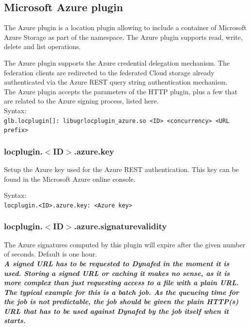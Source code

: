 \documentclass[12pt]{article} %
\begin{document}
\subsection{Microsoft Azure plugin}
The Azure plugin is a location plugin allowing to include a container of Microsoft Azure Storage as part of the namespace. The Azure plugin supports read, write, delete and list operations.

The Azure plugin supports the Azure credential delegation mechanism. The federation clients are redirected to the federated Cloud storage already authenticated via the Azure REST query string authentication mechanism.\\
The Azure plugin accepts the parameters of the HTTP plugin, plus a few that are related to the Azure signing process, listed here.\\

Syntax:\\
\lstinline"glb.locplugin[]: libugrlocplugin_azure.so <ID> <concurrency> <URL prefix>"\\

\subsubsection{locplugin.$<$ID$>$.azure.key}
Setup the Azure key used for the Azure REST authentication. This key can be found in the Microsoft Azure online console.

Syntax:\\
\lstinline"locplugin.<ID>.azure.key: <Azure key>"\\


\subsubsection{locplugin.$<$ID$>$.azure.signaturevalidity}
The Azure signatures computed by this plugin will expire after the given number of seconds. Default is one hour.\\

\textit{\textbf{A signed URL has to be requested to Dynafed in the moment it is used. Storing a signed URL or caching it makes no sense, as it
is more complex than just requesting access to a file with a plain URL.\\
The typical example for this is a batch job. As the queueing time for the job is not predictable, the job should
be given the plain HTTP(s) URL that has to be used against Dynafed by the job itself when it starts.\\}}
\end{document}
